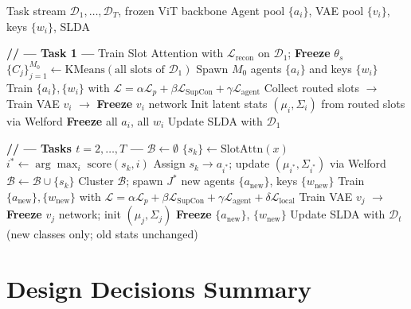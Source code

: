 \documentclass[11pt,a4paper]{article}
\newcommand{\Lcal}{\mathcal{L}}
\begin{document}
\begin{algorithm}[H]
\caption{Full Training Protocol}
\begin{algorithmic}[1]
\Require Task stream $\mathcal{D}_1,\ldots,\mathcal{D}_T$, frozen ViT backbone
\Ensure Agent pool $\{a_i\}$, VAE pool $\{v_i\}$, keys $\{w_i\}$, SLDA

\State \textbf{// --- Task 1 ---}
\State Train Slot Attention with $\Lcal_{\mathrm{recon}}$ on $\mathcal{D}_1$; \textbf{Freeze} $\theta_s$ 
\State $\{C_j\}_{j=1}^{M_0}\leftarrow\mathrm{KMeans}(\text{all slots of }\mathcal{D}_1)$
\State Spawn $M_0$ agents $\{a_i\}$ and keys $\{w_i\}$
\State Train $\{a_i\},\{w_i\}$ with $\Lcal=\alpha\Lcal_p+\beta\Lcal_{\mathrm{SupCon}}+\gamma\Lcal_{\mathrm{agent}}$
  \State Collect routed slots $\to$ Train VAE $v_i$ $\to$ \textbf{Freeze} $v_i$ network
  \State Init latent stats $(\mu_i,\Sigma_i)$ from routed slots via Welford
\EndFor
\State \textbf{Freeze} all $a_i$, all $w_i$
\State Update SLDA with $\mathcal{D}_1$

\State \textbf{// --- Tasks $t=2,\ldots,T$ ---}
  \State $\mathcal{B}\leftarrow\emptyset$
    \State $\{s_k\}\leftarrow\mathrm{SlotAttn}(x)$
      \State $i^*\leftarrow\arg\max_i\;\mathrm{score}(s_k,i)$
        \State Assign $s_k\to a_{i^*}$; update $(\mu_{i^*},\Sigma_{i^*})$ via Welford 
      \Else
        \State $\mathcal{B}\leftarrow\mathcal{B}\cup\{s_k\}$
      \EndIf
    \EndFor
  \EndFor
    \State Cluster $\mathcal{B}$; spawn $J^*$ new agents $\{a_{\mathrm{new}}\}$, keys $\{w_{\mathrm{new}}\}$
  \EndIf
  \State Train $\{a_{\mathrm{new}}\},\{w_{\mathrm{new}}\}$ with
         $\Lcal=\alpha\Lcal_p+\beta\Lcal_{\mathrm{SupCon}}+\gamma\Lcal_{\mathrm{agent}}+\delta\Lcal_{\mathrm{local}}$
    \State Train VAE $v_j$ $\to$ \textbf{Freeze} $v_j$ network; init $(\mu_j,\Sigma_j)$
  \EndFor
  \State \textbf{Freeze} $\{a_{\mathrm{new}}\}$, $\{w_{\mathrm{new}}\}$
  \State Update SLDA with $\mathcal{D}_t$ (new classes only; old stats unchanged)
\EndFor
\end{algorithmic}
\end{algorithm}

\section{Design Decisions Summary}
\end{document}
